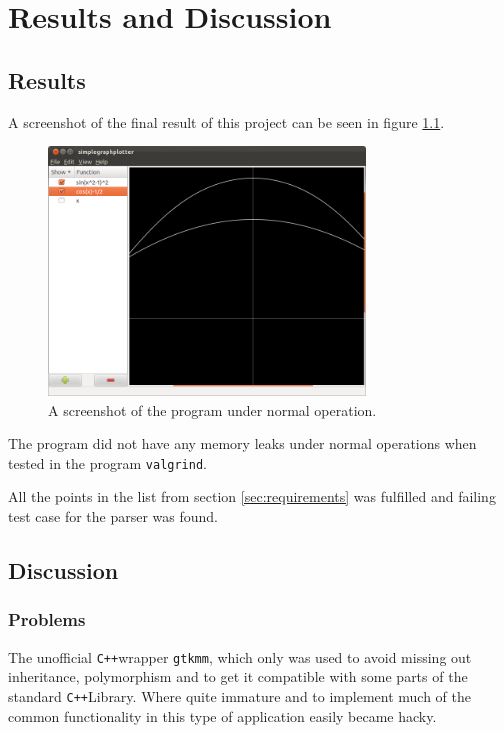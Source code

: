 \documentclass[a4paper,11pt]{kth-mag}
\newcommand{\Cpp}{\texttt{C++}}
\newcommand{\Gtkmm}{\texttt{gtkmm}}
\begin{document}
\chapter{Results and Discussion}

\section{Results}
A screenshot of the final result of this project can be seen in figure
\ref{fig:screenshot}.
\begin{figure}[H]
\begin{center}
    \includegraphics[width=0.75\textwidth]{screenshot00.png}
    \caption{\small{A screenshot of the program under normal operation.}}
   \label{fig:screenshot}
\end{center}
\end{figure}

The program did not have any memory leaks under normal operations when tested in the program
\texttt{valgrind}.

All the points in the list from section \ref{sec:requirements} was fulfilled
and failing test case for the parser was found. 

\section{Discussion}
    \subsection{Problems}
        The unofficial \Cpp wrapper \Gtkmm, which only was used to avoid
        missing out inheritance, polymorphism and to get it compatible with
        some parts of the standard \Cpp Library. Where quite immature and to
        implement much of the common functionality in this type of application 
        easily became hacky. 
        
\end{document}
